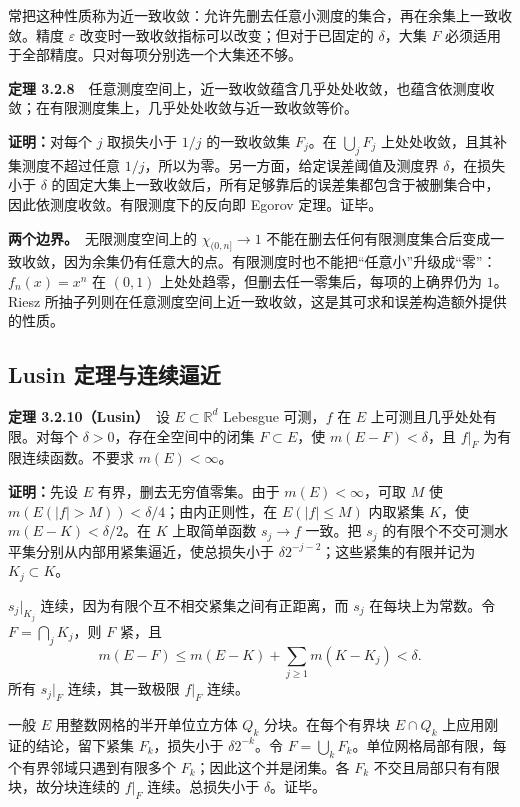 \documentclass[11pt,a4paper]{article}
\begin{document}
常把这种性质称为近一致收敛：允许先删去任意小测度的集合，再在余集上一致收敛。精度
\(\varepsilon\) 改变时一致收敛指标可以改变；但对于已固定的
\(\delta\)，大集 \(F\)
必须适用于全部精度。只对每项分别选一个大集还不够。

\textbf{定理
3.2.8}　任意测度空间上，近一致收敛蕴含几乎处处收敛，也蕴含依测度收敛；在有限测度集上，几乎处处收敛与近一致收敛等价。

\textbf{证明：}对每个 \(j\) 取损失小于 \(1/j\) 的一致收敛集 \(F_j\)。在
\(\bigcup_jF_j\) 上处处收敛，且其补集测度不超过任意
\(1/j\)，所以为零。另一方面，给定误差阈值及测度界 \(\delta\)，在损失小于
\(\delta\)
的固定大集上一致收敛后，所有足够靠后的误差集都包含于被删集合中，因此依测度收敛。有限测度下的反向即
Egorov 定理。证毕。

\textbf{两个边界。}　无限测度空间上的 \(\chi_{(0,n]}\to1\)
不能在删去任何有限测度集合后变成一致收敛，因为余集仍有任意大的点。有限测度时也不能把``任意小''升级成``零''：\(f_n(x)=x^n\)
在 \((0,1)\) 上处处趋零，但删去任一零集后，每项的上确界仍为 \(1\)。Riesz
所抽子列则在任意测度空间上近一致收敛，这是其可求和误差构造额外提供的性质。

\subsection{Lusin
定理与连续逼近}\label{lusin-ux5b9aux7406ux4e0eux8fdeux7eedux903cux8fd1}

\textbf{定理 3.2.10（Lusin）}　设 \(E\subset\mathbb R^d\) Lebesgue
可测，\(f\) 在 \(E\) 上可测且几乎处处有限。对每个
\(\delta>0\)，存在全空间中的闭集 \(F\subset E\)，使
\(m(E-F)<\delta\)，且 \(f|_F\) 为有限连续函数。不要求 \(m(E)<\infty\)。

\textbf{证明：}先设 \(E\) 有界，删去无穷值零集。由于
\(m(E)<\infty\)，可取 \(M\) 使 \(m(E(|f|>M))<\delta/4\)；由内正则性，在
\(E(|f|\le M)\) 内取紧集 \(K\)，使 \(m(E-K)<\delta/2\)。在 \(K\)
上取简单函数 \(s_j\to f\) 一致。把 \(s_j\)
的有限个不交可测水平集分别从内部用紧集逼近，使总损失小于
\(\delta2^{-j-2}\)；这些紧集的有限并记为 \(K_j\subset K\)。

\(s_j|_{K_j}\) 连续，因为有限个互不相交紧集之间有正距离，而 \(s_j\)
在每块上为常数。令 \(F=\bigcap_jK_j\)，则 \(F\) 紧，且 \[
m(E-F)\le m(E-K)+\sum_{j\ge1}m(K-K_j)<\delta.
\] 所有 \(s_j|_F\) 连续，其一致极限 \(f|_F\) 连续。

一般 \(E\) 用整数网格的半开单位立方体 \(Q_k\) 分块。在每个有界块
\(E\cap Q_k\) 上应用刚证的结论，留下紧集 \(F_k\)，损失小于
\(\delta2^{-k}\)。令
\(F=\bigcup_kF_k\)。单位网格局部有限，每个有界邻域只遇到有限多个
\(F_k\)；因此这个并是闭集。各 \(F_k\) 不交且局部只有有限块，故分块连续的
\(f|_F\) 连续。总损失小于 \(\delta\)。证毕。
\end{document}
